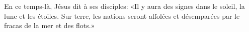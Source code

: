 En ce temps-là, Jésus dit à ses disciples:
	«Il y aura des signes dans le soleil, la lune et les étoiles.
Sur terre, les nations seront affolées
	et désemparées par le fracas de la mer et des flots.»
